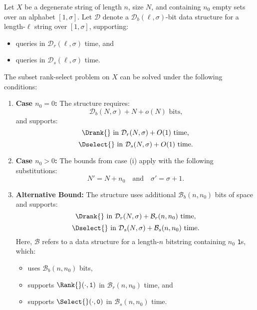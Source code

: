 \begin{theorem}
    \label{thm:general_upper_bound}
    Let $X$ be a degenerate string of length $n$, size $N$, and containing $n_0$ empty sets over an alphabet $[1, \sigma]$. Let $\mathcal{D}$ denote a $\mathcal{D}_b(\ell, \sigma)$-bit data structure for a length-$\ell$ string over $[1, \sigma]$, supporting:
    \begin{itemize}
        \item \Rank{} queries in $\mathcal{D}_r(\ell, \sigma)$ time, and
        \item \Select{} queries in $\mathcal{D}_s(\ell, \sigma)$ time.
    \end{itemize}
    The subset rank-select problem on $X$ can be solved under the following conditions:

    \begin{enumerate}[label=(\roman*)]
        \item \textbf{Case $n_0 = 0$:}
              The structure requires:
              \[
                  \mathcal{D}_b(N, \sigma) + N + o(N) \text{ bits,}
              \]
              and supports:
              \[
                  \Drank{} \text{ in } \mathcal{D}_r(N, \sigma) + O(1) \text{ time,}
              \]
              \[
                  \Dselect{} \text{ in } \mathcal{D}_s(N, \sigma) + O(1) \text{ time.}
              \]

        \item \textbf{Case $n_0 > 0$:}
              The bounds from case (i) apply with the following substitutions:
              \[
                  N' = N + n_0 \quad \text{and} \quad \sigma' = \sigma + 1.
              \]

        \item \textbf{Alternative Bound:}
              The structure uses additional $\mathcal{B}_b(n, n_0)$ bits of space and supports:
              \[
                  \Drank{} \text{ in } \mathcal{D}_r(N, \sigma) + \mathcal{B}_r(n, n_0) \text{ time,}
              \]
              \[
                  \Dselect{} \text{ in } \mathcal{D}_s(N, \sigma) + \mathcal{B}_s(n, n_0) \text{ time.}
              \]
              Here, $\mathcal{B}$ refers to a data structure for a length-$n$ bitstring containing $n_0$ \texttt{1}s, which:
              \begin{itemize}
                  \item uses $\mathcal{B}_b(n, n_0)$ bits,
                  \item supports $\Rank{}(\cdot, \texttt{1})$ in $\mathcal{B}_r(n, n_0)$ time, and
                  \item supports $\Select{}(\cdot, \texttt{0})$ in $\mathcal{B}_s(n, n_0)$ time.
              \end{itemize}
    \end{enumerate}
\end{theorem}


